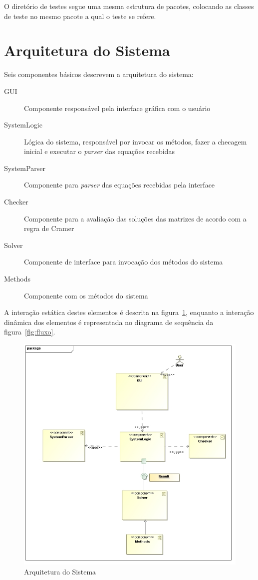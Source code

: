 \documentclass[a4paper,10pt]{report}
\begin{document}
O diretório de testes segue uma mesma estrutura de pacotes, colocando as classes de teste no mesmo pacote a qual o teste se refere.

\section{Arquitetura do Sistema}

Seis componentes básicos descrevem a arquitetura do sistema:
\begin{description}
 \item[GUI] Componente responsável pela interface gráfica com o usuário
 \item[SystemLogic] Lógica do sistema, responsável por invocar os métodos, fazer a checagem inicial e executar o \textit{parser} das equações recebidas
 \item[SystemParser] Componente para \textit{parser} das equações recebidas pela interface
 \item[Checker] Componente para a avaliação das soluções das matrizes de acordo com a regra de Cramer
 \item[Solver] Componente de interface para invocação dos métodos do sistema
 \item[Methods] Componente com os métodos do sistema
 \end{description}

A interação estática destes elementos é descrita na figura~\ref{fig:arquitetura}, enquanto a interação dinâmica dos elementos é representada no diagrama de sequência da figura~\ref{fig:fluxo}.

\begin{figure}
 \centering
 \includegraphics[width=\textwidth]{MSN1}
 \caption{Arquitetura do Sistema}
 \label{fig:arquitetura}
\end{figure}
\end{document}
